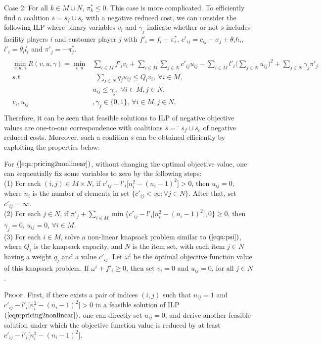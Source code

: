 \documentclass[ijoc,nonblindrev]{informs3} %
\begin{document}
Case 2: For all $k\in M\cup N$,  $\pi^*_k \leq 0$. This case is more complicated.
To efficiently find a coalition $\bar s = \bar{s}_f \cup \bar{s}_c$ with  a negative reduced cost, we can consider the following ILP where binary variables $v_i$ and $\gamma_j$ indicate
whether or not $\bar{s}$ includes facility players $i$ and customer player $j$ with $f'_i = f_i - \pi_i^*$, $c'_{ij} = c_{ij}-\sigma_j + \theta_ih_i$, $l'_i = \theta_il_i$ and $\pi'_j = -\pi_j^*$.
\begin{eqnarray}\label{eqn:pricing2nonlinear}
\begin{aligned}
\begin{split}
\min_{v;u;\gamma} R(v,u,\gamma) = \min_{v,u} &\sum_{i \in M} f'_i v_i + \sum_{i \in M}\sum_{j \in N} c'_{ij}u_{ij} - \sum_{i \in M} l'_i \big(\sum_{j \in N}u_{ij}\big)^2+ \sum_{j \in N} \gamma_j \pi'_j\\
s.t.&~~\sum_{j \in N}q_ju_{ij} \leq Q_iv_i, ~\forall i \in M,\\
&u_{ij} \leq \gamma_j,~\forall i \in M, j \in N,\\
v_i, u_{ij}&, \gamma_j \in \big\{0,1\big\},~\forall i \in M, j \in N,
\end{split}
\end{aligned}
\end{eqnarray}
Therefore, it can be seen that feasible solutions to ILP of negative objective values are one-to-one correspondence with coalitions $\bar{s} =  ̄\bar{s}_f \cup \bar{s}_c$ of negative reduced costs. Moreover, such a coalition $\bar{s}$ can be obtained efficiently by exploiting the properties below:

\begin{lemma}\label{lemma:efficientconditions}
For $(\ref{eqn:pricing2nonlinear})$, without changing the optimal objective value, one can sequentially fix some variables to zero by the following steps:\\
{\rm (1)} For each $(i,j)\in M\times N$, if $c'_{ij} - l'_i\big[n_i^2 - (n_i-1)^2\big] > 0$, then $u_{ij}=0$, where $n_i$ is the number of elements in set $\{c'_{ij} < \infty: \forall j \in N\}$. After that, set $c'_{ij}=\infty$.\\
{\rm (2)} For each $j\in N$, if $\pi'_j+\sum_{i\in M}\min\{c'_{ij}- l'_i\big[n_i^2 - (n_i-1)^2\big],0\} \geq 0$, then $\gamma_j=0$, $ u_{ij}=0$,  $\forall i\in M$. \\
{\rm (3)} For each $i\in M$, solve a non-linear knapsack problem similar to $(\ref{eqn:psi})$, where $Q_i$ is the knapsack capacity, and $N$ is the item set, with each item $j\in N$ having a weight $q_j$ and a value $c'_{ij}$. Let $\omega^i$ be the optimal objective function value of this knapsack problem. If   $\omega^{i} + f'_{i} \geq 0$, then set $v_i=0$ and $u_{ij}=0$, for all $j\in N$.
\end{lemma}
{\scshape Proof.}
First, if there exists a pair of indices $(i,j)$ such that $u_{ij} = 1$ and $c'_{ij} - l'_i\big[n_i^2 - (n_i-1)^2\big] > 0$ in a feasible solution of ILP $(\ref{eqn:pricing2nonlinear})$, one can directly set $u_{ij} = 0$, and derive another feasible solution under which the objective function value is reduced by at least $c'_{ij} - l'_i\big[n_i^2 - (n_i-1)^2\big]$.
\end{document}
